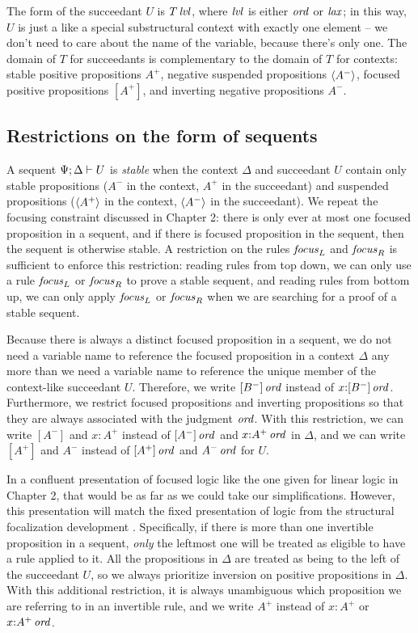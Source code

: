 The form of the succeedant $U$ is ${T}\,{{\it lvl}}$, where ${\it lvl}$ is either
${\it ord}$ or ${\it lax}$; in this way, $U$ is just a like a special
substructural context with exactly one element -- we don't need
to care about the name of the variable, because there's only one.  The
domain of $T$ for succeedants is complementary to the domain of $T$
for contexts: stable positive propositions $A^+$, negative suspended
propositions $\langle {A^-} \rangle$, focused positive propositions $[A^+]$, and
inverting negative propositions $A^-$.

\subsection{Restrictions on the form of sequents}

A sequent ${\Psi};{\Delta} \vdash {U}$ is {\it stable} when the context
$\Delta$ and succeedant $U$ contain only stable propositions ($A^-$ in
the context, $A^+$ in the succeedant) and suspended propositions
($\langle {A^+} \rangle$ in the context, $\langle {A^-} \rangle$ in the succeedant). We
repeat the focusing constraint discussed in Chapter 2: there is only
ever at most one focused proposition in a sequent, and if there is
focused proposition in the sequent, then the sequent is otherwise
stable. A restriction on the rules ${\it focus}_L$ and ${\it focus}_R$
is sufficient to enforce this restriction: reading rules from
top down, we can only use a rule ${\it focus}_L$ or ${\it focus}_R$ to
prove a stable sequent, and reading rules from bottom up, we can only
apply ${\it focus}_L$ or ${\it focus}_R$ when we are searching for a
proof of a stable sequent.

Because there is always a distinct focused proposition in a sequent,
we do not need a variable name to reference the focused proposition in
a context $\Delta$ any more than we need a variable name to reference
the unique member of the context-like succeedant $U$. Therefore, we
write ${[B^-]}\,{{\it ord}}$ instead of $x{:}{[B^-]}\,{{\it ord}}$. Furthermore,
we restrict focused propositions and inverting propositions so that
they are always associated with the judgment ${\it ord}$. With this
restriction, we can write $[A^-]$ and $x{:}A^+$ instead of
${[A^-]}\,{{\it ord}}$ and $x{:}{A^+}\,{{\it ord}}$ in $\Delta$, and we can write
$[A^+]$ and $A^-$ instead of ${[A^+]}\,{{\it ord}}$ and ${A^-}\,{{\it ord}}$ for
$U$.

In a confluent presentation of focused logic like the one given for
linear logic in Chapter 2, that would be as far as we could take our
simplifications. However, this presentation will match the fixed
presentation of logic from the structural focalization development
\cite{simmons11structural}. Specifically, if there is more than one
invertible proposition in a sequent, {\it only} the leftmost one will
be treated as eligible to have a rule applied to it. All the
propositions in $\Delta$ are treated as being to the left of the
succeedant $U$, so we always prioritize inversion on positive
propositions in $\Delta$. With this additional restriction, it is
always unambiguous which proposition we are referring to in an
invertible rule, and we write $A^+$ instead of $x{:}A^+$ or
$x{:}{A^+}\,{{\it ord}}$.

